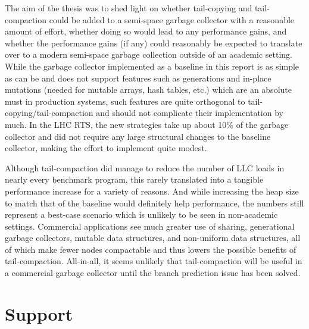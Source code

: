 \documentclass[a4paper,oneside]{memoir}
\begin{document}
The aim of the thesis was to shed light on whether tail-copying and
tail-compaction could be added to a semi-space garbage collector with a
reasonable amount of effort, whether doing so would lead to any performance
gains, and whether the performance gains (if any) could reasonably be expected
to translate over to a modern semi-space garbage collection outside of an
academic setting. While the garbage collector implemented as a baseline in this
report is as simple as can be and does not support features such as generations
and in-place mutations (needed for mutable arrays, hash tables, etc.) which are
an absolute must in production systems, such features are quite orthogonal to
tail-copying/tail-compaction and should not complicate their implementation by
much. In the LHC RTS, the new strategies take up about 10\% of the garbage
collector and did not require any large structural changes to the baseline
collector, making the effort to implement quite modest.

Although tail-compaction did manage to reduce the number of LLC loads in nearly
every benchmark program, this rarely translated into a tangible performance
increase for a variety of reasons. And while increasing the heap size to match
that of the baseline would definitely help performance, the numbers still
represent a best-case scenario which is unlikely to be seen in non-academic
settings. Commercial applications see much greater use of sharing, generational
garbage collectors, mutable data structures, and non-uniform data structures, all
of which make fewer nodes compactable and thus lowers the possible benefits of
tail-compaction. All-in-all, it seems unlikely that tail-compaction will be
useful in a commercial garbage collector until the branch prediction issue has
been solved.

\chapter*{Support}



\end{document}
